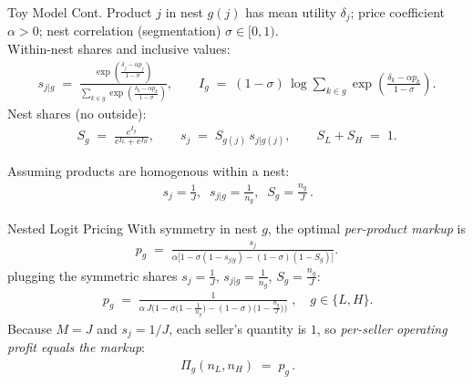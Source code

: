 \documentclass[10pt, xcolor=dvipsnames]{beamer}
\begin{document}
\begin{frame}{Toy Model Cont.}
    Product $j$ in nest $g(j)$ has mean utility $\delta_j$; price coefficient $\alpha>0$; nest correlation (segmentation) $\sigma\in[0,1)$. \\
    
    Within-nest shares and inclusive values:
        \begin{align*}
            s_{j|g} \;=\;
            \frac{\exp\!\left(\frac{\delta_j-\alpha p_j}{1-\sigma}\right)}
            {\sum_{k\in g}\exp\!\left(\frac{\delta_k-\alpha p_k}{1-\sigma}\right)},
            \qquad
            I_g \;=\; (1-\sigma)\,\log\!\sum_{k\in g}\exp\!\left(\frac{\delta_k-\alpha p_k}{1-\sigma}\right).
        \end{align*}
    Nest shares (no outside):
        \begin{align*}
            S_g \;=\;\frac{e^{I_g}}{e^{I_L}+e^{I_H}},
            \qquad
            s_j \;=\; S_{g(j)}\,s_{j|g(j)},
            \qquad
            S_L+S_H \;=\; 1.
        \end{align*}
    
    Assuming products are homogenous within a nest: 
        \begin{align*}
            \boxed{\,s_j=\tfrac{1}{J},\;\; s_{j|g}=\tfrac{1}{n_g},\;\; S_g=\tfrac{n_g}{J}\,}.
        \end{align*}
    
\end{frame}

\begin{frame}{Nested Logit Pricing}
    With symmetry in nest $g$, the optimal \emph{per-product markup} is
        \begin{align*}
            p_g \;=\; \frac{s_j}{\alpha\big[1 - \sigma(1-s_{j|g}) - (1-\sigma)(1-S_g)\big]}.
        \end{align*}
plugging the symmetric shares $s_j=\tfrac{1}{J}$, $s_{j|g}=\tfrac{1}{n_g}$, $S_g=\tfrac{n_g}{J}$:
\begin{align*}
\boxed{
\,p_g 
\;=\;
\frac{1}{\alpha\,J\Big(1 - \sigma\!\big(1-\tfrac{1}{n_g}\big) - (1-\sigma)\!\big(1-\tfrac{n_g}{J}\big)\Big)}\;,\quad g\in\{L,H\}.
}
\end{align*}
Because $M=J$ and $s_j=1/J$, each seller’s quantity is $1$, so \emph{per-seller operating profit equals the markup}:
\begin{align*}
    \boxed{\,\Pi_g(n_L,n_H) \;=\; p_g \,}.
\end{align*}
    
\end{frame}
\end{document}
